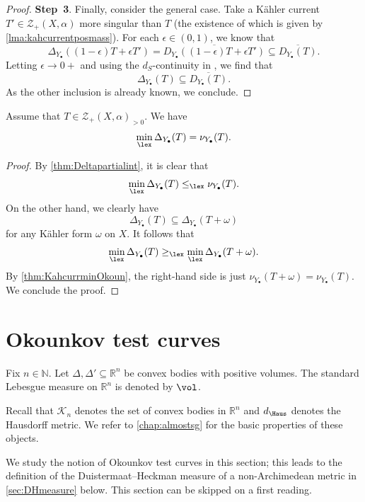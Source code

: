 \begin{proof}
\textbf{Step~3}.
Finally, consider the general case. Take a Kähler current $T'\in \mathcal{Z}_+(X,\alpha)$ more singular than $T$ (the existence of which is given by \cref{lma:kahcurrentposmass}). For each $\epsilon\in (0,1)$, we know that
\[
\Delta_{Y_{\bullet}}((1-\epsilon)T+\epsilon T')=\overline{D_{Y_{\bullet}}((1-\epsilon)T+\epsilon T')}
\subseteq \overline{D_{Y_{\bullet}}(T)}.
\]
Letting $\epsilon\to 0+$ and using the $d_S$-continuity in ,
we find that
\[
\Delta_{Y_{\bullet}}(T)\subseteq \overline{D_{Y_{\bullet}}(T)}.
\]
As the other inclusion is already known, we conclude.
\end{proof}

\begin{corollary}\label{cor:KahcurrminOkoun}
Assume that $T\in \mathcal{Z}_+(X,\alpha)_{>0}$.
We have
\begin{equation}\label{eq:minOkounkov3}
    \min_{\lex} \Delta_{Y_{\bullet}}(T)=\nu_{Y_{\bullet}}(T).
\end{equation}
\end{corollary}
\begin{proof}
    By \cref{thm:Deltapartialint}, it is clear that
    \[
    \min_{\lex} \Delta_{Y_{\bullet}}(T)\leq_{\lex}\nu_{Y_{\bullet}}(T).
    \]
    On the other hand, we clearly have
    \[
    \Delta_{Y_{\bullet}}(T)\subseteq \Delta_{Y_{\bullet}}(T+\omega)
    \]
    for any Kähler form $\omega$ on $X$. It follows that
    \[
    \min_{\lex} \Delta_{Y_{\bullet}}(T)\geq_{\lex} \min_{\lex} \Delta_{Y_{\bullet}}(T+\omega).
    \]
    By \cref{thm:KahcurrminOkoun}, the right-hand side is just $\nu_{Y_{\bullet}}(T+\omega)=\nu_{Y_{\bullet}}(T)$. We conclude the proof.
\end{proof}



\section{Okounkov test curves}\label{sec:Okotc}
Fix $n\in \mathbb{N}$.
Let $\Delta,\Delta'\subseteq \mathbb{R}^n$ be convex bodies with positive volumes. The standard Lebesgue measure on $\mathbb{R}^n$ is denoted by $\vol$.

Recall that $\mathcal{K}_n$ denotes the set of convex bodies in $\mathbb{R}^n$ and $d_{\Haus}$ denotes the Hausdorff metric.
We refer to \cref{chap:almostsg} for the basic properties of these objects.

We study the notion of Okounkov test curves in this section; this leads to the definition of the Duistermaat--Heckman measure of a non-Archimedean metric in \cref{sec:DHmeasure} below. This section can be skipped on a first reading.

